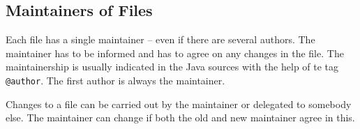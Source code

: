 \subsection{Maintainers of Files}

Each file has a single maintainer -- even if there are several
authors. The maintainer has to be informed and has to agree on any
changes in the file. The maintainership is usually indicated in the
Java sources with the help of te tag \texttt{@author}. The first
author is always the maintainer.

Changes to a file can be carried out by the maintainer or delegated to
somebody else. The maintainer can change if both the old and new
maintainer agree in this.

